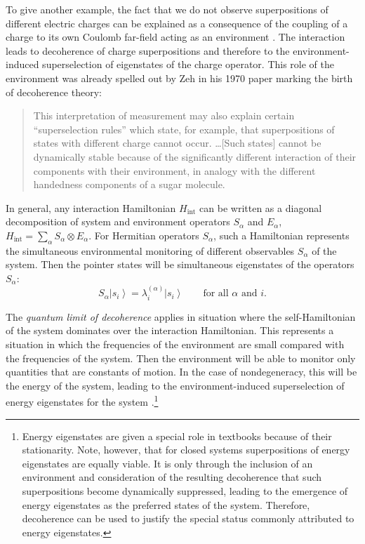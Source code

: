 \documentclass[3p,sort&compress,12pt]{elsarticle}
\newcommand{\ket}[1]{\left\vert{#1}\right\rangle}
\newcommand{\op}[1]{#1}
\begin{document}
To give another example, the fact that we do not observe superpositions of different electric charges can be explained as a consequence of the coupling of a charge to its own Coulomb far-field acting as an environment \cite{Zeh:1970:yt,Giulini:1995:zh,Giulini:2000:ry}. The interaction leads to decoherence of charge superpositions and therefore to the environment-induced superselection of eigenstates of the charge operator. This role of the environment was already spelled out by Zeh \cite{Zeh:1970:yt} in his 1970 paper marking the birth of decoherence theory:
%
\begin{quote}
This interpretation of measurement may also explain certain ``superselection rules'' which state, for example, that superpositions of states with different charge cannot occur. \dots [Such states] cannot be dynamically stable because of the significantly different interaction of their components with their environment, in analogy with the different handedness components of a sugar molecule.
\end{quote}
%

In general, any interaction Hamiltonian $\op{H}_\text{int}$ can be written as a diagonal decomposition of system and environment operators $\op{S}_\alpha$ and $\op{E}_\alpha$, $\op{H}_\text{int} =  \sum_\alpha \op{S}_\alpha \otimes \op{E}_\alpha$. For Hermitian operators $\op{S}_\alpha$, such a Hamiltonian represents the simultaneous environmental monitoring of different observables $\op{S}_\alpha$ of the system. Then the pointer states will be simultaneous eigenstates of the operators $\op{S}_\alpha$:
%
\begin{equation}
  \label{eq:OIbvsrhjkbv9}
  \op{S}_\alpha \ket{s_i} = \lambda_i^{(\alpha)}\ket{s_i} \qquad
  \text{for all $\alpha$ and $i$}. 
\end{equation}
% 

The \emph{quantum limit of decoherence} \cite{Paz:1999:vv} applies in situation where the self-Hamiltonian of the system dominates over the interaction Hamiltonian. This represents a situation in which the frequencies of the environment are small compared with the frequencies of the system. Then the environment will be able to monitor only quantities that are constants of motion. In the case of nondegeneracy, this will be the energy of the system, leading to the environment-induced superselection of energy eigenstates for the system \cite{Paz:1999:vv}.\footnote{Energy eigenstates are given a special role in textbooks because of their stationarity. Note, however, that for closed systems superpositions of energy eigenstates are equally viable. It is only through the inclusion of an environment and consideration of the resulting decoherence that such superpositions become dynamically suppressed, leading to the emergence of energy eigenstates as the preferred states of the system. Therefore, decoherence can be used to justify the special status commonly attributed to energy eigenstates.}
\end{document}
